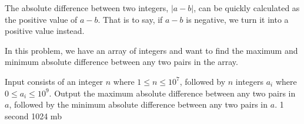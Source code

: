 {The absolute difference between two integers, $|a - b|$, can be quickly calculated as the positive value of $a - b$. That is to say, if $a - b$ is negative, we turn it into a positive value instead.

In this problem, we have an array of integers and want to find the maximum and minimum absolute difference between any two pairs in the array.}
{Input consists of an integer $n$ where $1 \le n \le 10^7$, followed by $n$ integers $a_i$ where $0 \le a_i \le 10^9$.}
{Output the maximum absolute difference between any two pairs in $a$, followed by the minimum absolute difference between any two pairs in $a$.}
{1 second}
{1024 mb}
{
}